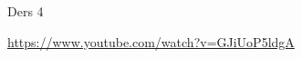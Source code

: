 \documentclass[12pt,fleqn]{article}\usepackage{../../common}
\begin{document}
Ders 4











\url{https://www.youtube.com/watch?v=GJiUoP5ldgA}
\end{document}
